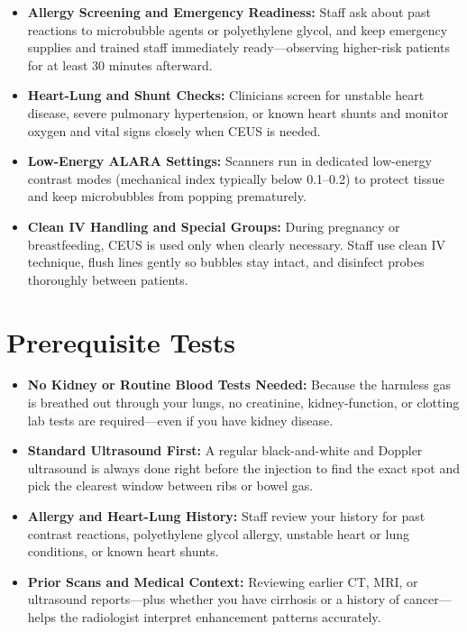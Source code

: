 \begin{itemize}
    \item \textbf{Allergy Screening and Emergency Readiness:} Staff ask about past reactions to microbubble agents or polyethylene glycol, and keep emergency supplies and trained staff immediately ready---observing higher-risk patients for at least 30 minutes afterward.
    \item \textbf{Heart-Lung and Shunt Checks:} Clinicians screen for unstable heart disease, severe pulmonary hypertension, or known heart shunts and monitor oxygen and vital signs closely when CEUS is needed.
    \item \textbf{Low-Energy ALARA Settings:} Scanners run in dedicated low-energy contrast modes (mechanical index typically below 0.1--0.2) to protect tissue and keep microbubbles from popping prematurely.
    \item \textbf{Clean IV Handling and Special Groups:} During pregnancy or breastfeeding, CEUS is used only when clearly necessary. Staff use clean IV technique, flush lines gently so bubbles stay intact, and disinfect probes thoroughly between patients.
\end{itemize}

\section{Prerequisite Tests}

\begin{itemize}
    \item \textbf{No Kidney or Routine Blood Tests Needed:} Because the harmless gas is breathed out through your lungs, no creatinine, kidney-function, or clotting lab tests are required---even if you have kidney disease.
    \item \textbf{Standard Ultrasound First:} A regular black-and-white and Doppler ultrasound is always done right before the injection to find the exact spot and pick the clearest window between ribs or bowel gas.
    \item \textbf{Allergy and Heart-Lung History:} Staff review your history for past contrast reactions, polyethylene glycol allergy, unstable heart or lung conditions, or known heart shunts.
    \item \textbf{Prior Scans and Medical Context:} Reviewing earlier CT, MRI, or ultrasound reports---plus whether you have cirrhosis or a history of cancer---helps the radiologist interpret enhancement patterns accurately.
\end{itemize}

